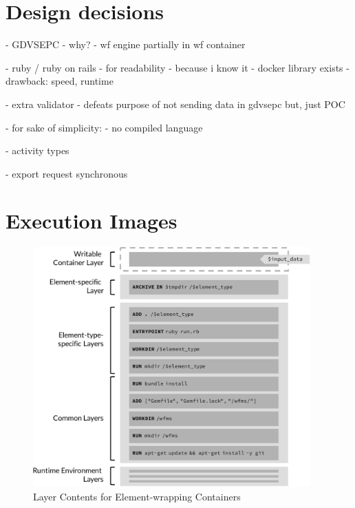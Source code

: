 
\section{Design decisions} %
\label{sec:design_decisions}

  - GDVSEPC
    - why?
  - wf engine partially in wf container

  - ruby / ruby on rails
    - for readability
    - because i know it
    - docker library exists
    - drawback: speed, runtime

  - extra validator
    - defeats purpose of not sending data in gdvsepc but, just POC

  - for sake of simplicity:
    - no compiled language

  - activity types

  - export request synchronous

\section{Execution Images} %
\label{sec:execution_images}
  \begin{figure}[htbp]
    \centering
    \includegraphics[width=0.95\textwidth]{content/images/execution_container-crop.pdf}
    \caption{Layer Contents for Element-wrapping Containers}
    \label{fig:detailed_layers_for_element_wrapping_containers}
  \end{figure}

